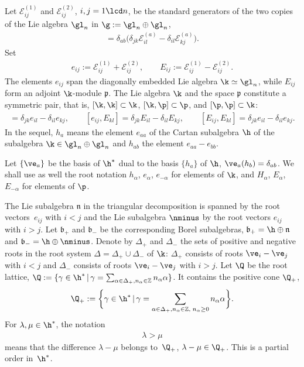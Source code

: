 \documentclass[pdftex]{sigma}
\def\a{\alpha}\def\Ar{{\rm A}}\def\Ab{\bar{\rm A}}\def\b{\beta}\def\bb{\mathfrak{b}}
\def\nplus{\mathfrak{n}}\def\nn{\nonumber}\def\nin{\noindent}
\newcommand{\ZZ}{{\mathbb Z}}\def\Hom{\operatorname{Hom}}\def\I{\mathrm{I}}
\numberwithin{equation}{section}
\begin{document}
Let ${\mathcal{E}}_{ij}^{(1)}$ and ${\mathcal{E}}_{ij}^{(2)}$, $i,j=1\lcd n$, be the standard generators of the two copies of the Lie algebra $\gl_n$ in $\g:=\gl_n\oplus\gl_n$,
\begin{gather*}
[{\mathcal{E}}_{ij}^{(a)},{\mathcal{E}}_{kl}^{(b)}]=\delta_{ab}\big(\delta_{jk}{\mathcal{E}}_{il}^{(a)}-\delta_{il}{\mathcal{E}}_{kj}^{(a)}\big) .\end{gather*}
Set
\begin{gather*}
 e_{ij}:={\mathcal{E}}_{ij}^{(1)}+{\mathcal{E}}_{ij}^{(2)} ,\qquad E_{ij}:={\mathcal{E}}_{ij}^{(1)}-{\mathcal{E}}_{ij}^{(2)}
 .
 \end{gather*}
The elements $e_{ij}$ span the diagonally embedded Lie algebra $\k\simeq\gl_n$, while $E_{ij}$ form an adjoint $\k$-module $\mathfrak{p}$. The
Lie algebra $\k$ and the space $\mathfrak{p}$ constitute a symmetric pair, that is, $[\k,\k]\subset \k$, $[\k,\p]\subset \p$, and $[\p,\p]\subset \k$:
\begin{gather*}
 [e_{ij},e_{kl}] = \delta_{jk}e_{il}-\delta_{il}e_{kj}  ,\qquad
  [e_{ij},E_{kl}] = \delta_{jk}E_{il}-\delta_{il}E_{kj}  ,\qquad
   [E_{ij},E_{kl}] = \delta_{jk}e_{il}-\delta_{il}e_{kj} .
\end{gather*}
In the sequel, $h_a$ means the element $e_{aa}$ of the Cartan subalgebra $\h$ of the subalgebra $\k\in\gl_n\oplus\gl_n$ and $h_{ab}$ the
element $e_{aa}-e_{bb}$.


Let $\{\ve_a\}$ be the basis of $\h^*$ dual to the basis $\{ h_a\}$ of $\h$, $\ve_a(h_b)=\delta_{ab}$. We shall use as well the root notation $h_\alpha$,
$e_{\alpha}$, $e_{-\alpha}$ for elements of $\k$, and $H_\alpha$, $E_{\alpha}$, $E_{-\alpha}$ for elements of $\p$.


The Lie subalgebra $\nplus$ in the triangular decomposition  is spanned by the root vectors~$e_{ij}$ with $i<j$ and the Lie subalgebra $\nminus$ by the
root vectors $e_{ij}$ with $i>j$. Let $\bb_+$ and $\bb_-$
be the corresponding Borel subalgebras, $\bb_+=\h\oplus\nplus$ and $\bb_-=\h\oplus\nminus$. Denote by $\Delta_+$ and $\Delta_-$ the sets of positive and
negative roots in the root system $\Delta=\Delta_+\cup \Delta_-$ of $\k$: $\Delta_+$ consists of roots $\ve_i-\ve_j$ with $i<j$ and $\Delta_-$ consists of roots
$\ve_i-\ve_j$ with $i>j$.
Let $\Q$ be the root lattice, $\Q:=\{\gamma\in\h^*\,|\,\gamma=\sum_{\alpha\in\Delta_+, n_\a\in\ZZ}n_\a \a\}$. It contains the
positive cone $\Q_+$,
\begin{gather*}
\Q_+:=\bigg\{\gamma\in\h^*\,|\,\gamma= \sum_{\alpha\in\Delta_+, n_\a\in\ZZ, \; n_\a\geq 0}n_\a \a\bigg\} .%
\end{gather*}
For $\lambda,\mu\in\h^*$, the notation
\begin{gather}
\lambda>\mu\label{paor}
\end{gather}
means that the dif\/ference $\lambda-\mu$ belongs to~$\Q_+$, $\lambda-\mu\in\Q_+$. This is a partial order in~$\h^*$.
\end{document}
